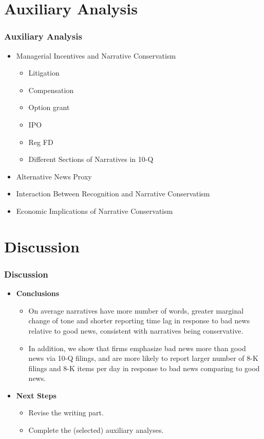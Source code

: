 \documentclass{beamer}
\begin{document}
\section{Auxiliary Analysis}
\begin{frame}
\frametitle{Auxiliary Analysis}
\begin{itemize}
\item Managerial Incentives and Narrative Conservatism
	\begin{itemize}
		\item Litigation
		\item Compensation
		\item Option grant
		\item IPO
		\item Reg FD \citep{kothariManagersWithholdBad2009}
		\item Different Sections of Narratives in 10-Q
	\end{itemize}
\item Alternative News Proxy

\item Interaction Between Recognition and Narrative Conservatism

\item Economic Implications of Narrative Conservatism
\end{itemize}

\end{frame}
\section{Discussion}
\begin{frame}
\frametitle{Discussion}
\begin{itemize}
	\item \textbf{Conclusions}
	\begin{itemize}
		\item On average narratives have more number of words, greater marginal change of tone and shorter reporting time lag in response to bad news relative to good news, consistent with narratives being conservative.
		\item In addition, we show that firms emphasize bad news more than good news via 10-Q filings, and are more likely to report larger number of 8-K filings and 8-K items per day in response to bad news comparing to good news.
	\end{itemize}
	
	\item \textbf{Next Steps}
	\begin{itemize}
		\item Revise the writing part.
		\item Complete the (selected) auxiliary analyses.
	\end{itemize}
	
\end{itemize}

\end{frame}
\end{document}
